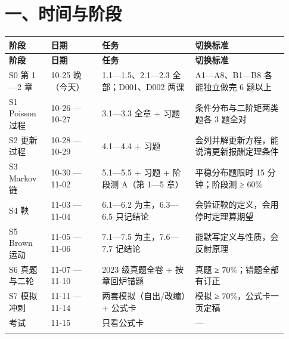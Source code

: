 \documentclass[UTF8,a4paper,11pt]{ctexart}
\begin{document}
\section{一、时间与阶段}
{\small\renewcommand{\arraystretch}{1.38}\setlength{\tabcolsep}{3.5pt}
\begin{longtable}{P{0.14\linewidth}P{0.17\linewidth}P{0.31\linewidth}P{0.31\linewidth}}
\toprule
\bfseries 阶段 & \bfseries 日期 & \bfseries 任务 & \bfseries 切换标准 \\
\midrule
\endfirsthead
\toprule
\bfseries 阶段 & \bfseries 日期 & \bfseries 任务 & \bfseries 切换标准 \\
\midrule
\endhead
S0 第 1—2 章 & 10-25 晚（今天） & 1.1—1.5、2.1—2.3 全部；D001、D002 两课 & A1—A8、B1—B8 各能独立做完 6 题以上 \\
\addlinespace[.35em]
S1 Poisson 过程 & 10-26 — 10-27 & 3.1—3.3 全章 + 习题 & 条件分布与二阶矩两类题各 3 题全对 \\
\addlinespace[.35em]
S2 更新过程 & 10-28 — 10-29 & 4.1—4.4 + 习题 & 会列并解更新方程，能说清更新报酬定理条件 \\
\addlinespace[.35em]
S3 Markov 链 & 10-30 — 11-02 & 5.1—5.5 + 习题 + 阶段测 A（第 1—5 章） & 平稳分布题限时 15 分钟；阶段测 ≥ 60\% \\
\addlinespace[.35em]
S4 鞅 & 11-03 — 11-04 & 6.1—6.2 为主，6.3—6.5 只记结论 & 会验证鞅的定义，会用停时定理算期望 \\
\addlinespace[.35em]
S5 Brown 运动 & 11-05 — 11-06 & 7.1—7.5 为主，7.6—7.7 记结论 & 能默写定义与性质，会反射原理 \\
\addlinespace[.35em]
S6 真题与二轮 & 11-07 — 11-10 & 2023 级真题全卷 + 按章回炉错题 & 真题 ≥ 70\%；错题全部有订正 \\
\addlinespace[.35em]
S7 模拟冲刺 & 11-11 — 11-14 & 两套模拟（自出/改编）+ 公式卡 & 模拟 ≥ 70\%，公式卡一页定稿 \\
\addlinespace[.35em]
考试 & 11-15 & 只看公式卡 & — \\
\addlinespace[.35em]
\bottomrule
\end{longtable}
}
\end{document}
